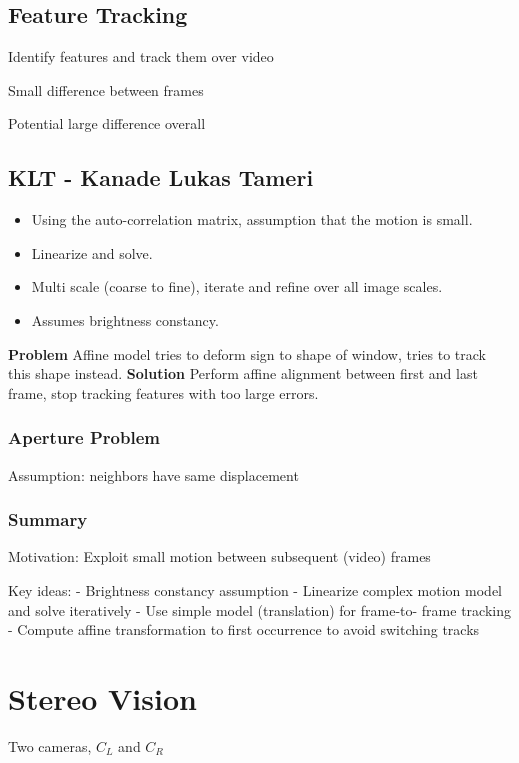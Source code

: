 \subsection{Feature Tracking}

Identify features and track them over video

Small difference between frames

Potential large difference overall

\subsection{KLT - Kanade Lukas Tameri}
\begin{itemize}
\item Using the auto-correlation matrix, assumption that the motion is small.
\item Linearize and solve.
\item Multi scale (coarse to fine), iterate and refine over all image scales.
\item Assumes brightness constancy.
\end{itemize}

\textbf{Problem}  Affine model tries to deform sign to shape of window, tries to track this shape instead. 
\textbf{Solution} Perform affine alignment between first and last frame, stop tracking features with too large errors. 

\subsubsection{Aperture Problem}

Assumption: neighbors have same displacement

\subsubsection{Summary}
Motivation: Exploit small motion between subsequent (video) frames

Key ideas:
- Brightness constancy assumption
- Linearize complex motion model and solve iteratively
- Use simple model (translation) for frame-to- frame tracking
- Compute affine transformation to first occurrence to avoid switching tracks


\section{Stereo Vision}

Two cameras, $C_L$ and $C_R$

